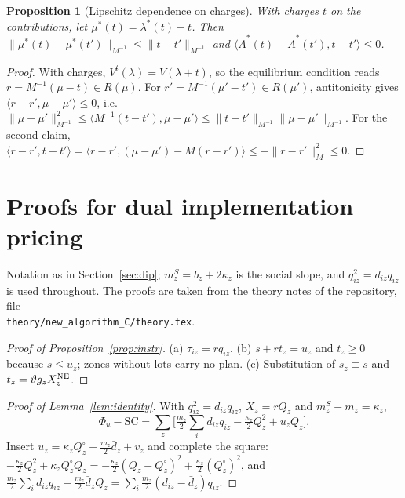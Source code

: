 \documentclass[preprint,12pt]{elsarticle}
\newtheorem{proposition}[theorem]{Proposition}
\theoremstyle{definition}
\theoremstyle{remark}
\newcommand{\Abar}{\bar A}
\newcommand{\ip}[2]{\langle #1,#2\rangle}
\begin{document}
\begin{proposition}[Lipschitz dependence on charges]\label{prop:charges}
With charges $t$ on the contributions, let $\mu^*(t)=\lambda^*(t)+t$. Then $\|\mu^*(t)-\mu^*(t')\|_{M^{-1}}\le\|t-t'\|_{M^{-1}}$ and $\ip{\Abar^*(t)-\Abar^*(t')}{t-t'}\le0$.
\end{proposition}
\begin{proof}
With charges, $V^t(\lambda)=V(\lambda+t)$, so the equilibrium condition reads $r=M^{-1}(\mu-t)\in R(\mu)$. For $r'=M^{-1}(\mu'-t')\in R(\mu')$, antitonicity gives $\ip{r-r'}{\mu-\mu'}\le0$, i.e.\ $\|\mu-\mu'\|^2_{M^{-1}}\le\ip{M^{-1}(t-t')}{\mu-\mu'}\le\|t-t'\|_{M^{-1}}\|\mu-\mu'\|_{M^{-1}}$. For the second claim, $\ip{r-r'}{t-t'}=\ip{r-r'}{(\mu-\mu')-M(r-r')}\le-\|r-r'\|^2_M\le0$.
\end{proof}

\section{Proofs for dual implementation pricing}\label{app:dip}

Notation as in Section~\ref{sec:dip}; $m^S_z=b_z+2\kappa_z$ is the social slope, and $q_{iz}^2=d_{iz}q_{iz}$ is used throughout. The proofs are taken from the theory notes of the repository, file\\ \texttt{theory/new\_algorithm\_C/theory.tex}.

\begin{proof}[Proof of Proposition~\ref{prop:instr}]
(a) $\tau_{iz}=rq_{iz}$. (b) $s+rt_z=u_z$ and $t_z\ge0$ because $s\le u_z$; zones without lots carry no plan. (c) Substitution of $s_z\equiv s$ and $t_z=\vartheta g_zX^{\rm NE}_z$.
\end{proof}

\begin{proof}[Proof of Lemma~\ref{lem:identity}]
With $q_{iz}^2=d_{iz}q_{iz}$, $X_z=rQ_z$ and $m^S_z-m_z=\kappa_z$, \[\Phi_u-\mathrm{SC}=\sum_z\big[\tfrac{m_z}{2}\textstyle\sum_id_{iz}q_{iz}-\tfrac{\kappa_z}{2}Q_z^2+u_zQ_z\big].\] Insert $u_z=\kappa_zQ^\circ_z-\tfrac{m_z}{2}\bar d_z+v_z$ and complete the square: $-\tfrac{\kappa_z}{2}Q_z^2+\kappa_zQ^\circ_zQ_z=-\tfrac{\kappa_z}{2}(Q_z-Q^\circ_z)^2+\tfrac{\kappa_z}{2}(Q^\circ_z)^2$, and $\tfrac{m_z}{2}\sum_id_{iz}q_{iz}-\tfrac{m_z}{2}\bar d_zQ_z=\sum_i\tfrac{m_z}{2}(d_{iz}-\bar d_z)q_{iz}$.
\end{proof}
\end{document}
